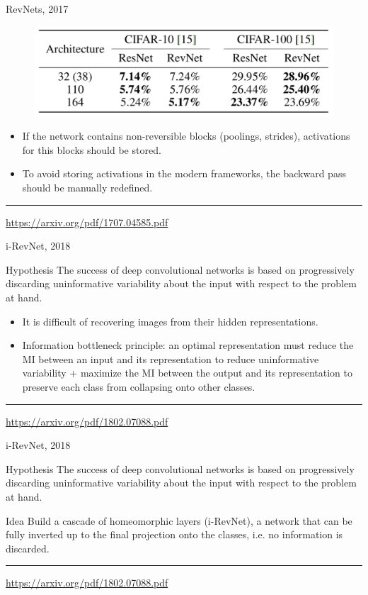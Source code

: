 \documentclass{beamer}
\begin{document}
\begin{frame}{RevNets, 2017}
	\begin{figure}
		\centering
		\includegraphics[width=0.8\linewidth]{figs/revnet_results.png}
	\end{figure}
	\begin{itemize}
		\item If the network contains non-reversible blocks (poolings, strides), activations for this blocks should be stored.
		\item To avoid storing activations in the modern frameworks, the backward pass should be manually redefined.
	\end{itemize}
	\vfill
	\hrule\medskip
	{\scriptsize \href{https://arxiv.org/pdf/1707.04585.pdf}{https://arxiv.org/pdf/1707.04585.pdf}} 
\end{frame}
\begin{frame}{i-RevNet, 2018}
	\begin{block}{Hypothesis}
		The success of deep convolutional networks is based on progressively discarding uninformative variability about the input with respect to the problem at hand. 
	\end{block}
	\begin{itemize}
		\item It is difficult of recovering images from their hidden representations. 
		\item Information bottleneck principle: an optimal representation must reduce the MI between an input and its representation to reduce uninformative variability + maximize the MI between the output and its representation to preserve each class from collapsing onto other classes.
	\end{itemize}
	\vfill
	\hrule\medskip
	{\scriptsize \href{https://arxiv.org/pdf/1802.07088.pdf}{https://arxiv.org/pdf/1802.07088.pdf}} 
\end{frame}
\begin{frame}{i-RevNet, 2018}
	\begin{block}{Hypothesis}
		The success of deep convolutional networks is based on progressively discarding uninformative variability about the input with respect to the problem at hand. 
	\end{block}
	
	\begin{block}{Idea}
		Build a cascade of homeomorphic layers (i-RevNet), a network that can be fully inverted up to the final projection onto the classes, i.e. no information is discarded.
	\end{block}
	
	\vfill
	\hrule\medskip
	{\scriptsize \href{https://arxiv.org/pdf/1802.07088.pdf}{https://arxiv.org/pdf/1802.07088.pdf}} 
\end{frame}
\end{document}
